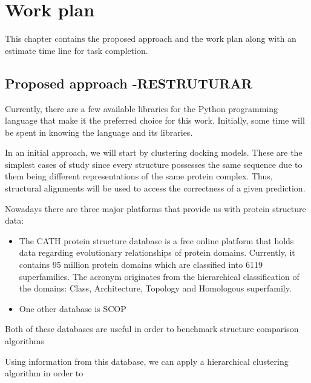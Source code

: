 \chapter{Work plan}
\label{cha:users_manual}

This chapter contains the proposed approach and the work plan along with an estimate time line for task completion.

\section{Proposed approach -RESTRUTURAR}


Currently, there are a few available libraries for the Python programming language that make it the preferred choice for this work. Initially, some time will be spent in knowing the language and its libraries.


In an initial approach, we will start by clustering docking models. These are the simplest cases of study since every structure possesses the same sequence due to them being different representations of the same protein complex. Thus, structural alignments will be used to access the correctness of a given prediction.

Nowadays there are three major platforms that provide us with protein structure data:
\begin{itemize}

\item The CATH protein structure database is a free online platform that holds data regarding evolutionary relationships of protein domains. Currently, it contains 95 million protein domains which are classified into 6119 superfamilies. The acronym originates from the hierarchical classification of the domains: Class, Architecture, Topology and Homologous superfamily.

\item One other database is SCOP

\end{itemize}

Both of these databases are useful in order to benchmark structure comparison algorithms

Using information from this database, we can apply a hierarchical clustering algorithm in order to


